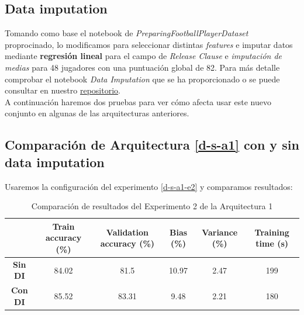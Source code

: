 \documentclass{article}
\begin{document}
		\subsection{Data imputation}
		\label{d-s-dp-di}
			Tomando como base el notebook de \textit{PreparingFootballPlayerDataset} proprocinado, lo modificamos para seleccionar distintas \textit{features} e imputar datos mediante \textbf{regresi\'on lineal} para el campo de \textit{Release Clause} e \textit{imputaci\'on de medias} para 48 jugadores con una puntuaci\'on global de 82. Para m\'as detalle comprobar el notebook \textit{Data Imputation} que se ha proporcionado o se puede consultar en nuestro \href{https://github.com/Dacarpe03/FIFAPlayersClassification/blob/main/DataProcessingNotebooks/Data%20Imputation.ipynb}{repositorio}.
			\\A continuaci\'on haremos dos pruebas para ver c\'omo afecta usar este nuevo conjunto en algunas de las arquitecturas anteriores.
			
		\subsection{Comparaci\'on de Arquitectura \ref{d-s-a1} con y sin data imputation}
		\label{d-s-dp-1}
			Usaremos la configuraci\'on del experimento \ref{d-s-a1-e2} y comparamos resultados:
			\begin{table}[!h]
				\begin{center}
					\begin{tabular}{ c | c | c | c | c | c |}
						\ & \textbf{Train accuracy (\%)} & \textbf{Validation accuracy (\%)} & \textbf{Bias (\%)} & \textbf{Variance (\%)} & \textbf{Training time (s)} \\ \hline
						\textbf{Sin DI} & 84.02 & 81.5 & 10.97 & 2.47 & 199\\ \hline
						\textbf{Con DI} & 85.52 & 83.31 & 9.48 & 2.21 & 180 \\ \hline
					\end{tabular}
					\caption{Comparaci\'on de resultados del Experimento 2 de la Arquitectura 1}
					\label{tab:res-d-a1-e2}
				\end{center}
			\end{table}
			
\end{document}
